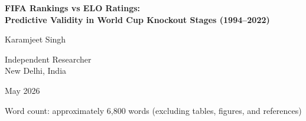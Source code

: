 \documentclass[12pt, a4paper]{article}
\begin{document}

\begin{titlepage}
  \centering
  \vspace*{2cm}
  {\LARGE\bfseries FIFA Rankings vs ELO Ratings:\\[0.4em]
  Predictive Validity in World Cup Knockout Stages (1994--2022)\par}
  \vspace{1.5cm}
  {\large Karamjeet Singh\par}
  \vspace{0.5cm}
  {\normalsize Independent Researcher\\
  New Delhi, India\par}
  \vspace{1cm}
  {\normalsize May 2026\par}
  \vspace{0.5cm}
  {\normalsize Word count: approximately 6,800 words (excluding tables, figures, and references)\par}
  \vfill
\end{titlepage}
\end{document}
